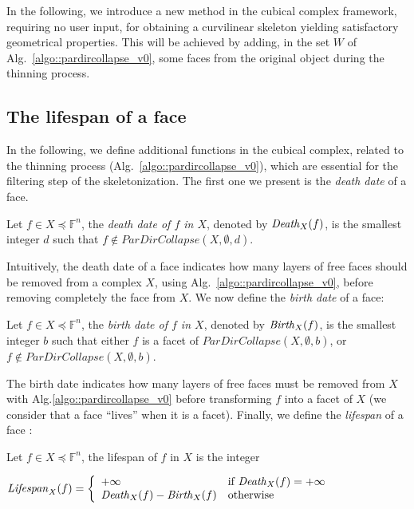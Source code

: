 \documentclass[final,envcountsame]{llncs}
\def\myem#1{{\em #1}}
\def\quotes#1{``#1''}
\def\birth#1#2{\mbox{\it{}Birth\/}_{#2}(#1)}
\def\death#1#2{\mbox{\it{}Death\/}_{#2}(#1)}
\def\lifespan#1#2{\mbox{\it{}Lifespan\/}_{#2}(#1)}
\def\allfaces#1{\mathbb{F}^{#1}}
\def\subcomplex#1#2{#1 \preceq #2}
\def\complex#1#2{\subcomplex{#2}{\allfaces{#1}}}
\begin{document}
In the following, we introduce a new method in the cubical complex framework, requiring no user input, for obtaining a curvilinear skeleton yielding satisfactory geometrical properties. This will be achieved by adding, in the set $W$ of Alg.~\ref{algo::pardircollapse_v0}, some faces from the original object during the thinning process.

\subsection{The lifespan of a face}
In the following, we define additional functions in the cubical complex, related to the thinning process (Alg.~\ref{algo::pardircollapse_v0}), which are essential for the filtering step of the skeletonization. The first one we present is the \myem{death date} of a face.

\begin{definition}
Let $f \in \complex{n}{X}$, the \myem{death date of $f$ in $X$}, denoted by $\death{f}{X}$, is the smallest integer $d$ such that $f \notin ParDirCollapse(X, \emptyset, d)$. 
\end{definition}

Intuitively, the death date of a face indicates how many layers of free faces should be removed from a complex $X$, using Alg.~\ref{algo::pardircollapse_v0}, before removing completely the face from $X$. We now define the \myem{birth date} of a face:

\begin{definition}
Let $f \in \complex{n}{X}$, the \myem{birth date of $f$ in $X$}, denoted by $\birth{f}{X}$, is the smallest integer $b$ such that either $f$ is a facet of $ParDirCollapse(X, \emptyset, b)$, or $f \notin ParDirCollapse(X, \emptyset, b)$.
\end{definition}

The birth date indicates how many layers of free faces must be removed from $X$ with Alg.\ref{algo::pardircollapse_v0} before transforming $f$ into a facet of $X$ (we consider that a face \quotes{lives} when it is a facet).
Finally, we define the \myem{lifespan} of a face :

\begin{definition}
Let $f \in \complex{n}{X}$, the lifespan of $f$ in $X$ is the integer 

\begin{math}
\lifespan{f}{X} = \left\{
\begin{array}{ll}
+\infty & \text{if $\death{f}{X}=+\infty$}\\
\death{f}{X} - \birth{f}{X} & \text{otherwise}
\end{array}
\right.
\end{math}
\end{definition}
\end{document}
